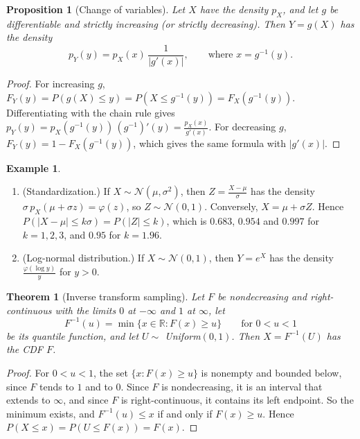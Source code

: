 \documentclass[11pt]{article}
\theoremstyle{definition}
\newtheorem{example}[definition]{Example}
\theoremstyle{plain}
\newtheorem{theorem}[definition]{Theorem}
\newtheorem{proposition}[definition]{Proposition}
\theoremstyle{remark}
\begin{document}
\begin{proposition}[Change of variables]\label{prop:change-of-variables-1d}
    Let $X$ have the density $p_X$, and let $g$ be differentiable and strictly increasing (or strictly decreasing). Then $Y = g(X)$ has the density
    \[p_Y(y) = p_X(x)\,\frac{1}{|g'(x)|}, \qquad \text{where } x = g^{-1}(y).\]
\end{proposition}

\begin{proof}
    For increasing $g$, $F_Y(y) = P(g(X) \leq y) = P(X \leq g^{-1}(y)) = F_X(g^{-1}(y))$. Differentiating with the chain rule gives $p_Y(y) = p_X(g^{-1}(y))\,(g^{-1})'(y) = \frac{p_X(x)}{g'(x)}$. For decreasing $g$, $F_Y(y) = 1 - F_X(g^{-1}(y))$, which gives the same formula with $|g'(x)|$.
\end{proof}

\begin{example}\label{ex:transformations}
    \begin{enumerate}
        \item (Standardization.) If $X \sim \mathcal{N}(\mu, \sigma^2)$, then $Z = \frac{X - \mu}{\sigma}$ has the density $\sigma\,p_X(\mu + \sigma z) = \varphi(z)$, so $Z \sim \mathcal{N}(0, 1)$. Conversely, $X = \mu + \sigma Z$. Hence $P(|X - \mu| \leq k\sigma) = P(|Z| \leq k)$, which is $0.683$, $0.954$ and $0.997$ for $k = 1, 2, 3$, and $0.95$ for $k = 1.96$.
        \item (Log-normal distribution.) If $X \sim \mathcal{N}(0, 1)$, then $Y = e^X$ has the density $\frac{\varphi(\log y)}{y}$ for $y > 0$.
    \end{enumerate}
\end{example}

\begin{theorem}[Inverse transform sampling]\label{thm:inverse-transform}
    Let $F$ be nondecreasing and right-continuous with the limits $0$ at $-\infty$ and $1$ at $\infty$, let
    \[F^{-1}(u) = \min\{x \in \mathbb{R} : F(x) \geq u\} \qquad \text{for } 0 < u < 1\]
    be its quantile function, and let $U \sim$ Uniform$(0, 1)$. Then $X = F^{-1}(U)$ has the CDF $F$.
\end{theorem}

\begin{proof}
    For $0 < u < 1$, the set $\{x : F(x) \geq u\}$ is nonempty and bounded below, since $F$ tends to $1$ and to $0$. Since $F$ is nondecreasing, it is an interval that extends to $\infty$, and since $F$ is right-continuous, it contains its left endpoint. So the minimum exists, and $F^{-1}(u) \leq x$ if and only if $F(x) \geq u$. Hence $P(X \leq x) = P(U \leq F(x)) = F(x)$.
\end{proof}
\end{document}
